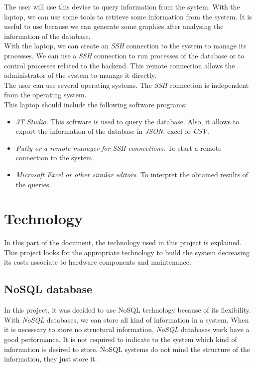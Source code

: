 The user will use this device to query information from the system. With the laptop, we can use some tools to retrieve some information from the system. It is useful to use because we can generate some graphics after analysing the information of the database.\\

With the laptop, we can create an \textit{SSH} connection to the system to manage its processes. We can use a \textit{SSH} connection to run processes of the database or to control processes related to the backend. This remote connection allows the administrator of the system to manage it directly.\\

The user can use several operating systems. The \textit{SSH} connection is independent from the operating system. \\

This laptop should include the following software programs:

\begin{itemize}

\item \textit{3T Studio}. This software is used to query the database. Also, it allows to export the information of the database in \textit{JSON}, excel or \textit{CSV}.

\item \textit{Putty or a remote manager for SSH connections}. To start a remote connection to the system.

\item \textit{Microsoft Excel or other similar editors}. To interpret the obtained results of the queries.

\end{itemize}

\section{Technology}

In this part of the document, the technology used in this project is explained. This project looks for the appropriate technology to build the system decreasing its costs associate to hardware components and maintenance.

\subsection{NoSQL database}

In this project, it was decided to use NoSQL technology because of its flexibility. With \textit{NoSQL} databases, we can store all kind of information in a system. When it is necessary to store no structural information, \textit{NoSQL} databases work have a good performance. It is not required to indicate to the system which kind of information is desired to store. NoSQL systems do not mind the structure of the information, they just store it.\\

